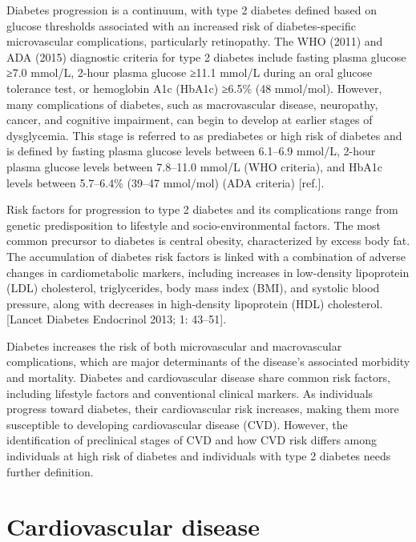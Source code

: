 \documentclass[
  a4paper,
  headsepline=true,
  open=any]{scrbook}
\begin{document}
Diabetes progression is a continuum, with type 2 diabetes defined based
on glucose thresholds associated with an increased risk of
diabetes-specific microvascular complications, particularly retinopathy.
The WHO (2011) and ADA (2015) diagnostic criteria for type 2 diabetes
include fasting plasma glucose ≥7.0 mmol/L, 2-hour plasma glucose ≥11.1
mmol/L during an oral glucose tolerance test, or hemoglobin A1c (HbA1c)
≥6.5\% (48 mmol/mol). However, many complications of diabetes, such as
macrovascular disease, neuropathy, cancer, and cognitive impairment, can
begin to develop at earlier stages of dysglycemia. This stage is
referred to as prediabetes or high risk of diabetes and is defined by
fasting plasma glucose levels between 6.1--6.9 mmol/L, 2-hour plasma
glucose levels between 7.8--11.0 mmol/L (WHO criteria), and HbA1c levels
between 5.7--6.4\% (39--47 mmol/mol) (ADA criteria) {[}ref.{]}.

Risk factors for progression to type 2 diabetes and its complications
range from genetic predisposition to lifestyle and socio-environmental
factors. The most common precursor to diabetes is central obesity,
characterized by excess body fat. The accumulation of diabetes risk
factors is linked with a combination of adverse changes in
cardiometabolic markers, including increases in low-density lipoprotein
(LDL) cholesterol, triglycerides, body mass index (BMI), and systolic
blood pressure, along with decreases in high-density lipoprotein (HDL)
cholesterol. {[}Lancet Diabetes Endocrinol 2013; 1: 43--51{]}.

Diabetes increases the risk of both microvascular and macrovascular
complications, which are major determinants of the disease's associated
morbidity and mortality. Diabetes and cardiovascular disease share
common risk factors, including lifestyle factors and conventional
clinical markers. As individuals progress toward diabetes, their
cardiovascular risk increases, making them more susceptible to
developing cardiovascular disease (CVD). However, the identification of
preclinical stages of CVD and how CVD risk differs among individuals at
high risk of diabetes and individuals with type 2 diabetes needs further
definition.

\hypertarget{cardiovascular-disease}{%
\section{Cardiovascular disease}\label{cardiovascular-disease}}
\end{document}
